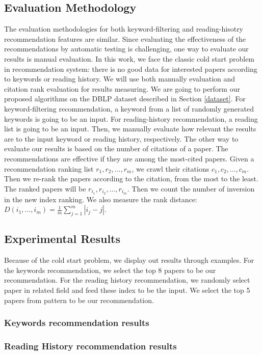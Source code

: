 \subsection{Evaluation Methodology}
%
The evaluation methodologies for both keyword-filtering and reading-hisotry recommendation features are similar.
%
Since evaluating the effectiveness of the recommendations by automatic testing is challenging, one way to evaluate our results is manual evaluation. In this work, we face the classic cold start problem in recommendation system: there is no good data for interested papers according to keywords or reading history. We will use both manually evaluation and citation rank evaluation for results measuring.
%
We are going to perform our proposed algorithms on the DBLP dataset described in Section \ref{dataset}.
%
For keyword-filtering recommendation, a keyword from a list of randomly generated keywords is going to be an input.
%
For reading-history recommendation, a reading list is going to be an input.
%
Then, we manually evaluate how relevant the results are to the input keyword or reading history, respectively.
%
The other way to evaluate our results is based on the number of citations of a paper. The recommendations are effective if they are among the most-cited papers.
%
Given a recommendation ranking list $r_1, r_2, ..., r_m$, we crawl their citations $c_1, c_2, ..., c_m$. Then we re-rank the papers according to the citation, from the most to the least. The ranked papers will be $r_{i_1}, r_{i_2},..., r_{i_m}$. Then we count the number of inversion in the new index ranking. We also measure the rank distance: $D(i_1, ..., i_m) = \frac{1}{m} \sum_{j=1}^m |i_j - j|$.
%


\subsection{Experimental Results}
%
Because of the cold start problem, we display out results through examples. For the keywords recommendation, we select the top 8 papers to be our recommendation. For the reading history recommendation, we randomly select paper in related field and feed these index to be the input. We select the top 5 papers from pattern to be our recommendation.

\subsubsection{Keywords recommendation results}


\subsubsection{Reading History recommendation results}

